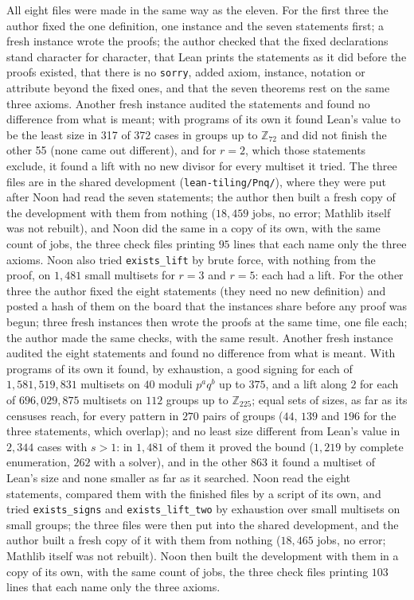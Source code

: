 \documentclass[11pt,a4paper]{amsart}
\theoremstyle{definition}
\theoremstyle{remark}
\newcommand{\Z}{\mathbb{Z}}
\newcommand{\lean}[1]{\texttt{#1}}
\begin{document}
All eight files were made in the same way as the eleven. For the first three the author fixed the one definition, one instance and the seven statements first; a fresh instance wrote the
proofs; the author checked that the fixed declarations stand character for character, that Lean prints the
statements as it did before the proofs existed, that there is no \lean{sorry}, added axiom, instance, notation
or attribute beyond the fixed ones, and that the seven theorems rest on the same three axioms. Another fresh
instance audited the statements and found no difference from what is meant; with programs of its own it found
Lean's value to be the least size in 317 of 372 cases in groups up to $\Z_{72}$ and did not finish the other 55
(none came out different), and for $r=2$, which those statements exclude, it found a lift with no new divisor for
every multiset it tried. The three files are in the shared development (\lean{lean-tiling/Pnq/}), where they were put after Noon had read the seven statements; the author then built a fresh copy of the development with them from nothing ($18{,}459$ jobs, no error; Mathlib itself was not rebuilt), and Noon did the same in a copy of its own, with the same count of jobs, the three check files printing $95$ lines that each name only the three axioms. Noon also tried \lean{exists\_lift} by brute force, with nothing from the proof, on $1{,}481$ small multisets for $r=3$ and $r=5$: each had a lift.
For the other three the author fixed the eight statements (they need no new definition) and posted a hash of them on the board that the instances share before any proof was
begun; three fresh instances then wrote the proofs at the same time, one file each; the author made the same checks, with the same result. Another fresh instance audited the eight statements and found no difference from what is meant. With programs of its own it found, by exhaustion, a good signing for each of $1{,}581{,}519{,}831$ multisets on $40$ moduli $p^aq^b$ up to $375$, and a lift along $2$ for each of $696{,}029{,}875$ multisets on $112$ groups up to $\Z_{225}$; equal sets of sizes, as far as its censuses reach, for every pattern in $270$ pairs of groups ($44$, $139$ and $196$ for the three statements, which overlap); and no least size different from Lean's value in $2{,}344$ cases with $s>1$: in $1{,}481$ of them it proved the bound ($1{,}219$ by complete enumeration, $262$ with a solver), and in the other $863$ it found a multiset of Lean's size and none smaller as far as it searched. Noon read the eight statements, compared them with the finished files by a script of its own, and tried \lean{exists\_signs} and \lean{exists\_lift\_two} by exhaustion over small multisets on small groups; the three files were then put into the shared development, and the author built a fresh copy of it with them from nothing ($18{,}465$ jobs, no error; Mathlib itself was not rebuilt). Noon then built the development with them in a copy of its own, with the same count of jobs, the three check files printing $103$ lines that each name only the three axioms.
\end{document}
